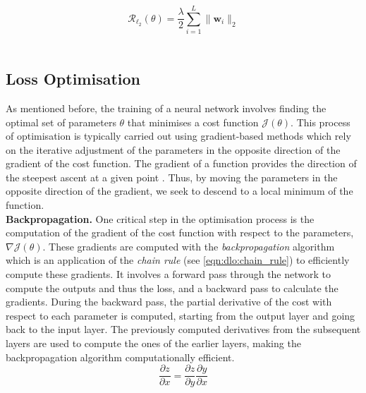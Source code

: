 \begin{equation}
  \label{eqn:dlo:reg_l2}
  \mathcal{R}_{\ell_2}(\theta) = \frac{\lambda}{2} \displaystyle \sum_{i=1}^{L} \| \mathbf{w}_i \|_2 
\end{equation}\\

\subsection{Loss Optimisation}\label{sec:dlo:backpropagation}

As mentioned before, the training of a neural network involves finding the
optimal set of parameters $\theta$ that minimises a cost function
$\mathcal{J}(\theta)$. This process of optimisation is typically carried out
using gradient-based methods which rely on the iterative adjustment of the
parameters in the opposite direction of the gradient of the cost function. The
gradient of a function provides the direction of the steepest ascent at a given
point \cite{boyd2004convex}. Thus, by moving the parameters in the opposite
direction of the gradient, we seek to descend to a local minimum of the
function.\\

\noindent \textbf{Backpropagation.} One critical step in the optimisation
process is the computation of the gradient of the cost function with respect to
the parameters, $\nabla \mathcal{J}(\theta)$. These gradients are computed with
the \emph{backpropagation} algorithm \cite{rumelhart1986learning} which is an
application of the \emph{chain rule} (see \cref{eqn:dlo:chain_rule}) to
efficiently compute these gradients. It involves a forward pass through the
network to compute the outputs and thus the loss, and a backward pass to
calculate the gradients. During the backward pass, the partial derivative of the
cost with respect to each parameter is computed, starting from the output layer
and going back to the input layer. The previously computed derivatives from the
subsequent layers are used to compute the ones of the earlier layers,  
making the backpropagation algorithm computationally efficient.\\

\begin{equation}
  \label{eqn:dlo:chain_rule}
  \frac{\partial z}{\partial x} = \frac{\partial z}{\partial y} \frac{\partial y}{\partial x}
\end{equation}\\

